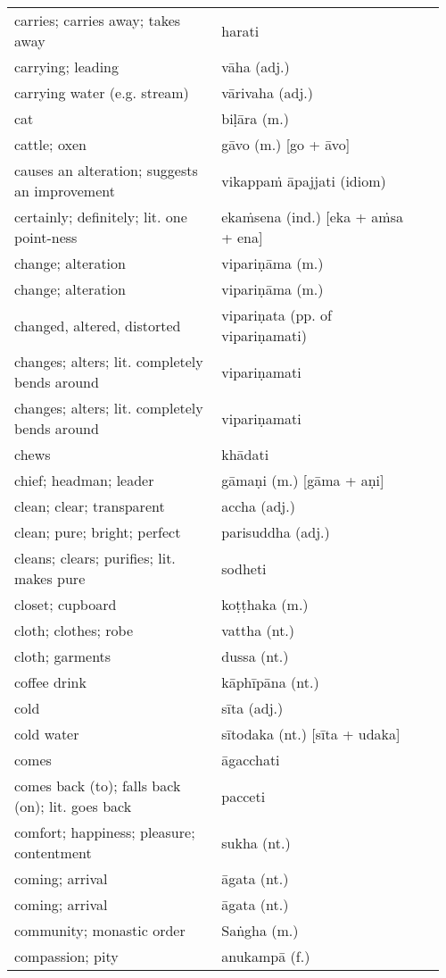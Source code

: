 \documentclass[a5paper]{memoir}
\begin{document}
\begin{longtable}{L{0.48\linewidth} L{0.48\linewidth} H}
carries; carries away; takes away & harati & \\
carrying; leading & vāha (adj.) & \\
carrying water (e.g. stream) & vārivaha (adj.) & \\
cat & biḷāra (m.) & \\
cattle; oxen & gāvo (m.) [go + āvo] & \\
causes an alteration; suggests an improvement & vikappaṁ āpajjati (idiom) & \\
certainly; definitely; lit. one point-ness & ekaṁsena (ind.) [eka + aṁsa + ena] & \\
change; alteration & vipariṇāma (m.) & \\
change; alteration & vipariṇāma (m.) & \\
changed, altered, distorted & vipariṇata (pp. of vipariṇamati) & \\
changes; alters; lit. completely bends around & vipariṇamati & \\
changes; alters; lit. completely bends around & vipariṇamati & \\
chews & khādati & \\
chief; headman; leader & gāmaṇi (m.) [gāma + aṇi] & \\
clean; clear; transparent & accha (adj.) & \\
clean; pure; bright; perfect & parisuddha (adj.) & \\
cleans; clears; purifies; lit. makes pure & sodheti & \\
closet; cupboard & koṭṭhaka (m.) & \\
cloth; clothes; robe & vattha (nt.) & \\
cloth; garments & dussa (nt.) & \\
coffee drink & kāphīpāna (nt.) & \\
cold & sīta (adj.) & \\
cold water & sītodaka (nt.) [sīta + udaka] & \\
comes & āgacchati & \\
comes back (to); falls back (on); lit. goes back & pacceti & \\
comfort; happiness; pleasure; contentment & sukha (nt.) & \\
coming; arrival & āgata (nt.) & \\
coming; arrival & āgata (nt.) & \\
community; monastic order & Saṅgha (m.) & \\
compassion; pity & anukampā (f.) & \\

\end{longtable}
\end{document}
